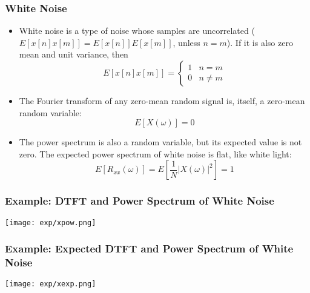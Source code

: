 \documentclass{beamer}
\begin{document}
\begin{frame}
  \frametitle{White Noise}

  \begin{itemize}
    \item White noise is a type of noise whose samples are uncorrelated
      ($E[x[n]x[m]]=E[x[n]]E[x[m]]$, unless $n=m$).  If it is also zero mean
      and unit variance, then
      \begin{displaymath}
      E\left[x[n]x[m]\right] = \begin{cases}1 & n=m\\0&n\ne m\end{cases}
      \end{displaymath}
    \item The Fourier transform of any zero-mean random signal is,
      itself, a zero-mean random variable:
      \begin{displaymath}
        E\left[X(\omega)\right] = 0
      \end{displaymath}
    \item The power spectrum is also a random variable, but its
      expected value is not zero.  The expected power spectrum of
      white noise is flat, like white light:
      \begin{displaymath}
        E\left[R_{xx}(\omega)\right] =  E\left[\frac{1}{N}|X(\omega)|^2\right] = 1
      \end{displaymath}
  \end{itemize}
\end{frame}

\begin{frame}
  \frametitle{Example: DTFT and Power Spectrum of White Noise}
  
  \centerline{\texttt{[image: exp/xpow.png]}}
\end{frame}

\begin{frame}
  \frametitle{Example: Expected DTFT and  Power Spectrum of White Noise}
  
  \centerline{\texttt{[image: exp/xexp.png]}}
\end{frame}
\end{document}
